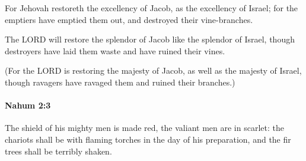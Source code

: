 			\begin{versebox}
					\item[BHS] 
					\item[LXX] 
					\item[ASV] For Jehovah restoreth the excellency of Jacob, as the excellency of Israel; for the emptiers have emptied them out, and destroyed their vine-branches.
					\item[NIV] The LORD will restore the splendor of Jacob like the splendor of Israel, though destroyers have laid them waste and have ruined their vines.
					\item[NRSV] (For the LORD is restoring the majesty of Jacob, as well as the majesty of Israel, though ravagers have ravaged them and ruined their branches.)
			\end{versebox}

		\paragraph{Nahum 2:3} %
			\label{NAHUM-2-3}

			The shield of his mighty men is made red, the valiant men are in scarlet: the chariots shall be with flaming torches in the day of his preparation, and the fir trees shall be terribly shaken.

